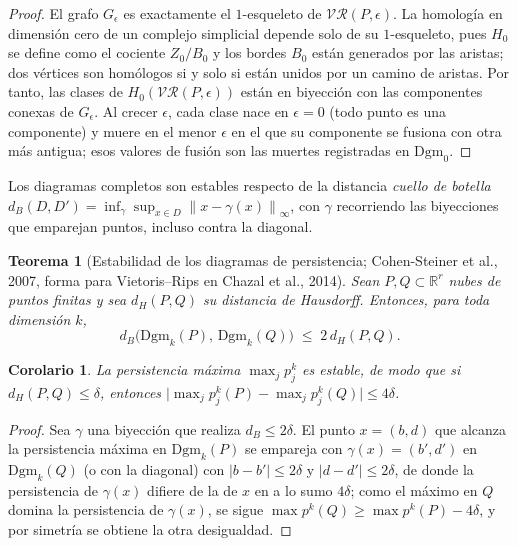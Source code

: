 \documentclass[11pt,a4paper]{article}
\theoremstyle{plain}
\newtheorem{theorem}{Teorema}
\newtheorem{corollary}{Corolario}
\theoremstyle{remark}
\newcommand{\Dgm}[1]{\mathrm{Dgm}_{#1}}
\newcommand{\norm}[1]{\left\lVert#1\right\rVert}
\newcommand{\R}{\mathbb{R}}
\begin{document}
\begin{proof}
El grafo $G_\epsilon$ es exactamente el $1$-esqueleto de $\mathcal{VR}(P,\epsilon)$. La homología en dimensión cero de un complejo simplicial depende solo de su $1$-esqueleto, pues $H_0$ se define como el cociente $Z_0/B_0$ y los bordes $B_0$ están generados por las aristas; dos vértices son homólogos si y solo si están unidos por un camino de aristas. Por tanto, las clases de $H_0(\mathcal{VR}(P,\epsilon))$ están en biyección con las componentes conexas de $G_\epsilon$. Al crecer $\epsilon$, cada clase nace en $\epsilon=0$ (todo punto es una componente) y muere en el menor $\epsilon$ en el que su componente se fusiona con otra más antigua; esos valores de fusión son las muertes registradas en $\Dgm{0}$.
\end{proof}

Los diagramas completos son estables respecto de la distancia \emph{cuello de botella} $d_B(D,D') = \inf_{\gamma}\sup_{x\in D}\norm{x-\gamma(x)}_\infty$, con $\gamma$ recorriendo las biyecciones que emparejan puntos, incluso contra la diagonal.

\begin{theorem}[Estabilidad de los diagramas de persistencia; Cohen-Steiner et al., 2007, forma para Vietoris--Rips en Chazal et al., 2014]
\label{thm:stability}
Sean $P, Q \subset \R^r$ nubes de puntos finitas y sea $d_H(P,Q)$ su distancia de Hausdorff. Entonces, para toda dimensión $k$,
\[
  d_B\bigl(\Dgm{k}(P),\, \Dgm{k}(Q)\bigr) \;\leq\; 2\, d_H(P, Q).
\]
\end{theorem}

\begin{corollary}
\label{cor:stability}
La persistencia máxima $\max_j p_j^k$ es estable, de modo que si $d_H(P,Q)\le\delta$, entonces $\bigl|\max_j p_j^k(P) - \max_j p_j^k(Q)\bigr| \le 4\delta$.
\end{corollary}

\begin{proof}
Sea $\gamma$ una biyección que realiza $d_B \le 2\delta$. El punto $x=(b,d)$ que alcanza la persistencia máxima en $\Dgm{k}(P)$ se empareja con $\gamma(x)=(b',d')$ en $\Dgm{k}(Q)$ (o con la diagonal) con $|b-b'|\le 2\delta$ y $|d-d'|\le 2\delta$, de donde la persistencia de $\gamma(x)$ difiere de la de $x$ en a lo sumo $4\delta$; como el máximo en $Q$ domina la persistencia de $\gamma(x)$, se sigue $\max p^k(Q) \ge \max p^k(P) - 4\delta$, y por simetría se obtiene la otra desigualdad.
\end{proof}
\end{document}
